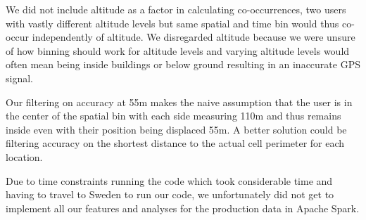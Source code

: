 We did not include altitude as a factor in calculating co-occurrences, two users with vastly different altitude levels but same spatial and time bin would thus co-occur independently of altitude. We disregarded altitude because we were unsure of how binning should work for altitude levels and varying altitude levels would often mean being inside buildings or below ground resulting in an inaccurate GPS signal.

Our filtering on accuracy at 55m makes the naive assumption that the user is in the center of the spatial bin with each side measuring 110m and thus remains inside even with their position being displaced 55m. A better solution could be filtering accuracy on the shortest distance to the actual cell perimeter for each location.

Due to time constraints running the code which took considerable time and having to travel to Sweden to run our code, we unfortunately did not get to implement all our features and analyses for the production data in Apache Spark.